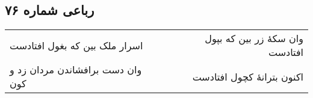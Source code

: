 \begin{center}
\section*{رباعی شماره ۷۶}
\label{sec:sh076}
\begin{longtable}{l p{0.5cm} r}
اسرار ملک بین که بغول افتادست
&&
وان سکهٔ زر بین که بپول افتادست
\\
وان دست برافشاندن مردان زد و کون
&&
اکنون بترانهٔ کچول افتادست
\\
\end{longtable}
\end{center}
